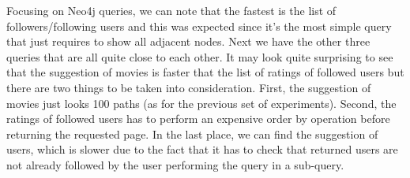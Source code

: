 \documentclass[11pt]{article}
\begin{document}
Focusing on Neo4j queries, we can note that the fastest is the list of 
followers/following users and this was expected since it's the most simple 
query that just requires to show all adjacent nodes. Next we have the 
other three queries that are all quite close to each other. It may look quite
surprising to see that the suggestion of movies is faster that the list of 
ratings of followed users but there are two things to be taken into 
consideration. First, the suggestion of movies just looks 100 paths (as for 
the previous set of experiments). Second, the ratings of followed users has 
to perform an expensive order by operation before returning the requested page.
In the last place, we can find the suggestion of users, which is slower due to 
the fact that it has to check that returned users are not already followed by 
the user performing the query in a sub-query.
\end{document}
